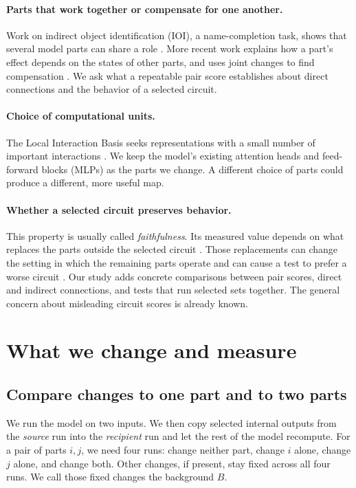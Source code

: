 \documentclass[11pt]{article}
\begin{document}
\paragraph{Parts that work together or compensate for one another.}
Work on indirect object identification (IOI), a name-completion task, shows
that several model parts can share a role \citep{wang2023ioi}. More recent
work explains how a part's effect depends on the states of other parts, and
uses joint changes to find compensation
\citep{vaidyanathan2026mediators,gong2026coax}. We ask what a repeatable pair
score establishes about direct connections and the behavior of a selected circuit.

\paragraph{Choice of computational units.}
The Local Interaction Basis seeks representations with a small number of
important interactions \citep{bushnaq2024lib}. We keep the model's existing
attention heads and feed-forward blocks (MLPs) as the parts we change. A
different choice of parts could produce a different, more useful map.

\paragraph{Whether a selected circuit preserves behavior.}
This property is usually called \emph{faithfulness}. Its measured value
depends on what replaces the parts outside the selected circuit
\citep{miller2024robustness}. Those replacements can change the setting in
which the remaining parts operate and can cause a test to prefer a worse
circuit \citep{geng2026recovery}. Our study adds concrete comparisons between
pair scores, direct and indirect connections, and tests that run selected sets
together. The general concern about misleading circuit scores is already known.

\section{What we change and measure}
\subsection{Compare changes to one part and to two parts}
We run the model on two inputs. We then copy selected internal outputs from
the \emph{source} run into the \emph{recipient} run and let the rest of the model
recompute. For a pair of parts $i,j$, we need four runs: change neither part,
change $i$ alone, change $j$ alone, and change both. Other changes, if present,
stay fixed across all four runs. We call those fixed changes the background $B$.
\end{document}
